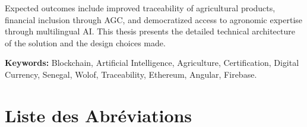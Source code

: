 \documentclass[12pt,a4paper]{report}
\begin{document}
\vspace{0.4cm}
\noindent
Expected outcomes include improved traceability of agricultural products, financial inclusion through AGC, and democratized access to agronomic expertise through multilingual AI. This thesis presents the detailed technical architecture of the solution and the design choices made.

\vspace{0.4cm}
\noindent
\textbf{Keywords:} Blockchain, Artificial Intelligence, Agriculture, Certification, Digital Currency, Senegal, Wolof, Traceability, Ethereum, Angular, Firebase.

\clearpage
\pagestyle{fancy}
\setcounter{page}{1}
\tableofcontents
\clearpage

\listoffigures
\clearpage

\chapter*{Liste des Abréviations}

\vspace{0.5cm}
\end{document}
